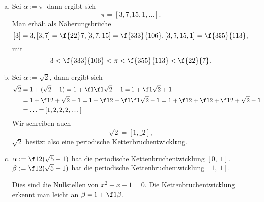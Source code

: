 \begin{ex} \label{6.4}
	\begin{enumerate}[a)]
		\item
			Sei $\alpha := \pi$, dann ergibt sich
			\[
				\pi = [3, 7, 15, 1, \dotsc].
			\]
			Man erhält als Näherungsbrüche
			\[
				[3] = 3, [3, 7] = \f {22}7, [3, 7, 15] = \f {333}{106}, [3, 7, 15, 1] = \f {355}{113},
			\]
			mit
			\[
				3 < \f {333}{106} < \pi  < \f {355}{113} < \f {22}{7}.
			\]
		\item
			Sei $\alpha := \sqrt 2$, dann ergibt sich
			\begin{align*}
				\sqrt 2
				&= 1 + (\sqrt 2 - 1)
				= 1 + \f 1{\f 1{\sqrt 2 - 1}}
				= 1 + \f 1{\sqrt 2 + 1} \\
				&= 1 + \f 1{2 + \sqrt 2 - 1}
				= 1 + \f 1{2 + \f 1{\f 1{\sqrt 2 - 1}}}
				= 1 + \f 1{2 + \f 1{2 + \f 1{2 + \sqrt 2 - 1}}} \\
				&= \dotsc
				= [1, 2, 2, 2, \dotsc]
			\end{align*}
			Wir schreiben auch
			\[
				\sqrt 2 = [1, \_2],
			\]
			$\sqrt 2$ besitzt also eine periodische Kettenbruchentwicklung.
		\item
			$\alpha := \f 12 (\sqrt 5 - 1)$ hat die periodische Kettenbruchentwicklung $[0, \_1]$.
			$\beta := \f 12 (\sqrt 5 + 1)$ hat die periodische Kettenbruchentwicklung $[1, \_1]$.

			Dies sind die Nullstellen von $x^2 - x - 1 = 0$.
			Die Kettenbruchentwicklung erkennt man leicht an $\beta = 1 + \f 1{\beta}$.
	\end{enumerate}
\end{ex}

